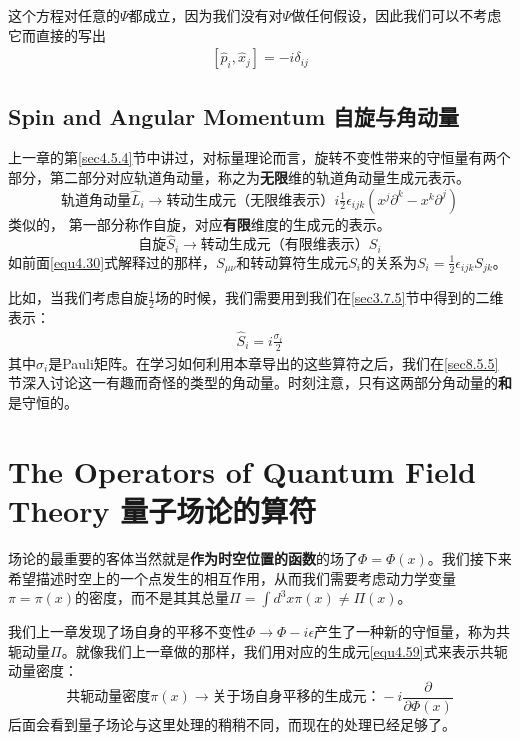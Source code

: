 这个方程对任意的$\Psi$都成立，因为我们没有对$\Psi$做任何假设，因此我们可以不考虑它而直接的写出
\begin{align}\label{equ5.3}
[\hat{p}_i,\hat{x}_j] = -i\delta_{ij}
\end{align}

\subsection[自旋与角动量]{Spin and Angular Momentum 自旋与角动量}\label{sec5.1.1}

上一章的第\ref{sec4.5.4}节中讲过，对标量理论而言，旋转不变性带来的守恒量有两个部分，第二部分对应轨道角动量，称之为{\bf 无限}维的轨道角动量生成元表示。
\[\text{轨道角动量}\hat{L}_i\to\text{转动生成元（无限维表示）}i\tfrac{1}{2}\epsilon_{ijk}(x^j\partial^k-x^k\partial^j)\]
类似的， 第一部分称作自旋，对应{\bf 有限}维度的生成元的表示。
\[\text{自旋}\hat{S}_i\to\text{转动生成元（有限维表示）}S_i \]
如前面\eqref{equ4.30}式解释过的那样，$S_{\mu\nu}$和转动算符生成元$S_i$的关系为$S_i = \tfrac{1}{2}\epsilon_{ijk}S_{jk}$。

比如，当我们考虑自旋$\tfrac{1}{2}$场的时候，我们需要用到我们在\ref{sec3.7.5}节中得到的二维表示：
\begin{align}\label{equ5.4}
\hat{S}_i = i\frac{\sigma_i}{2}
\end{align}
其中$\sigma_i$是Pauli矩阵。在学习如何利用本章导出的这些算符之后，我们在\ref{sec8.5.5}节深入讨论这一有趣而奇怪的类型的角动量。时刻注意，只有这两部分角动量的{\bf 和}是守恒的。

\section[量子场论的算符]{The Operators of Quantum Field Theory 量子场论的算符}\label{sec5.2}

场论的最重要的客体当然就是{\bf 作为时空位置的函数}的场了$\Phi = \Phi(x)$。我们接下来希望描述时空上的一个点发生的相互作用，从而我们需要考虑动力学变量$\pi = \pi(x)$的密度，而不是其其总量$\Pi = \int d^3x\pi(x)\neq\Pi(x)$。

我们上一章发现了场自身的平移不变性$\Phi\to\Phi-i\epsilon$产生了一种新的守恒量，称为共轭动量$\Pi$。就像我们上一章做的那样，我们用对应的生成元\eqref{equ4.59}式来表示共轭动量密度：
\[\text{共轭动量密度}\pi(x)\to\text{关于场自身平移的生成元：}-i\frac{\partial}{\partial\Phi(x)} \]
后面会看到量子场论与这里处理的稍稍不同，而现在的处理已经足够了。

